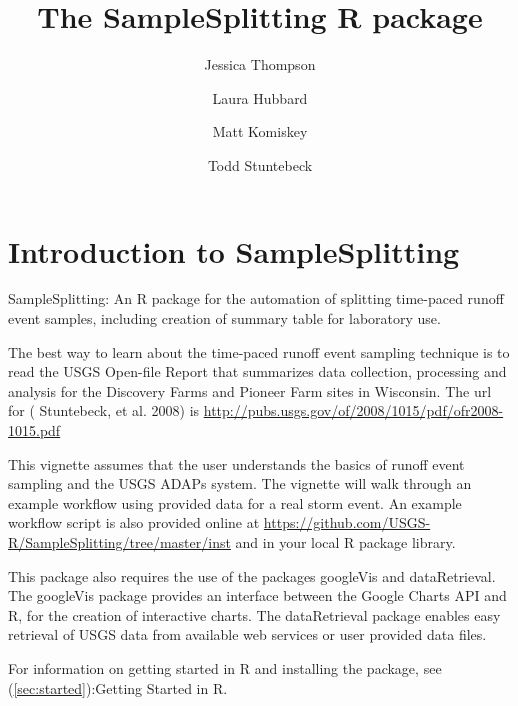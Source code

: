 \documentclass[a4paper,11pt]{article}\usepackage[]{graphicx}\usepackage[]{color}
\begin{document}
\title{The SampleSplitting R package}
\author[1]{Jessica Thompson}
\author[1]{Laura Hubbard}
\author[1]{Matt Komiskey}
\author[1]{Todd Stuntebeck}






\maketitle
\tableofcontents

\section{Introduction to SampleSplitting}

SampleSplitting: An R package for the automation of splitting time-paced runoff event samples, including creation of summary table for laboratory use.

The best way to learn about the time-paced runoff event sampling technique is to read the USGS Open-file Report that summarizes data collection, processing and analysis for the Discovery Farms and Pioneer Farm sites in Wisconsin. The url for (\cite{Stuntebeck} Stuntebeck, et al. 2008) is 
\url{http://pubs.usgs.gov/of/2008/1015/pdf/ofr2008-1015.pdf}

This vignette assumes that the user understands the basics of runoff event sampling and the USGS ADAPs system. The vignette will walk through an example workflow using provided data for a real storm event. An example workflow script is also provided online at \url {https://github.com/USGS-R/SampleSplitting/tree/master/inst} and in your local R package library.

This package also requires the use of the packages googleVis and dataRetrieval. The googleVis package provides an interface between the Google Charts API and R, for the creation of interactive charts. The dataRetrieval package enables easy retrieval of USGS data from available web services or user provided data files.

For information on getting started in R and installing the package, see (\ref{sec:started}):Getting Started in R. 

\end{document}
